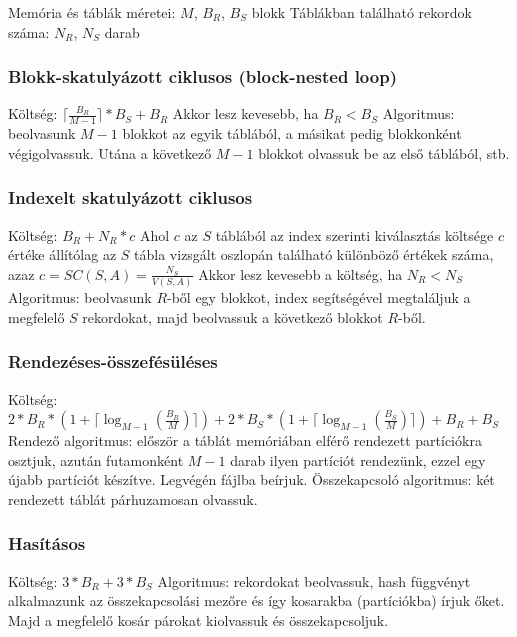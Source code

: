 \documentclass[12pt,a4paper]{article}
\begin{document}
\begin{outline}
	\1 Memória és táblák méretei: $M$, $B_R$, $B_S$ blokk
	\1 Táblákban található rekordok száma: $N_R$, $N_S$ darab
\end{outline}

\subsubsection{Blokk-skatulyázott ciklusos (block-nested loop)}

\begin{outline}
	\1 Költség: $\lceil \frac{B_R}{M-1} \rceil * B_S + B_R$
		\2 Akkor lesz kevesebb, ha $B_R < B_S$
	\1 Algoritmus: beolvasunk $M-1$ blokkot az egyik táblából, a másikat pedig blokkonként végigolvassuk. Utána a következő $M-1$ blokkot olvassuk be az első táblából, stb.
\end{outline}

\subsubsection{Indexelt skatulyázott ciklusos}

\begin{outline}
	\1 Költség: $B_R+N_R*c$
		\2 Ahol $c$ az $S$ táblából az index szerinti kiválasztás költsége
			\3 $c$ értéke állítólag az $S$ tábla vizsgált oszlopán található különböző értékek száma, azaz $c=SC(S,A)=\frac{N_S}{V(S,A)}$
		\2 Akkor lesz kevesebb a költség, ha $N_R < N_S$
	\1 Algoritmus: beolvasunk $R$-ből egy blokkot, index segítségével megtaláljuk a megfelelő $S$ rekordokat, majd beolvassuk a következő blokkot $R$-ből.
\end{outline}

\subsubsection{Rendezéses-összefésüléses}

\begin{outline}
	\1 Költség: $2 * B_R * (1 + \lceil \log_{M-1} (\frac{B_R}{M}) \rceil) + 2 * B_S * (1 + \lceil \log_{M-1} (\frac{B_S}{M}) \rceil) + B_R + B_S$
	\1 Rendező algoritmus: először a táblát memóriában elférő rendezett partíciókra osztjuk, azután futamonként $M-1$ darab ilyen partíciót rendezünk, ezzel egy újabb partíciót készítve. Legvégén fájlba beírjuk.
	\1 Összekapcsoló algoritmus: két rendezett táblát párhuzamosan olvassuk.
\end{outline}

\subsubsection{Hasításos}

\begin{outline}
	\1 Költség: $3*B_R + 3*B_S$
	\1 Algoritmus: rekordokat beolvassuk, hash függvényt alkalmazunk az összekapcsolási mezőre és így kosarakba (partíciókba) írjuk őket. Majd a megfelelő kosár párokat kiolvassuk és összekapcsoljuk.
\end{outline}
\end{document}
